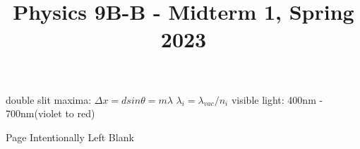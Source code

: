 \documentclass{exam}
\begin{document}
double slit maxima: $\Delta x = d sin\theta = m\lambda$
$\lambda_i = \lambda_{vac}/n_i$
visible light: 400nm - 700nm(violet to red)

\newpage
Page Intentionally Left Blank
\newpage




\title{Physics 9B-B - Midterm 1, Spring 2023}
\author{}
\date{}
\maketitle





\vspace{20mm}

\vspace{10mm}
\newpage
\end{document}
